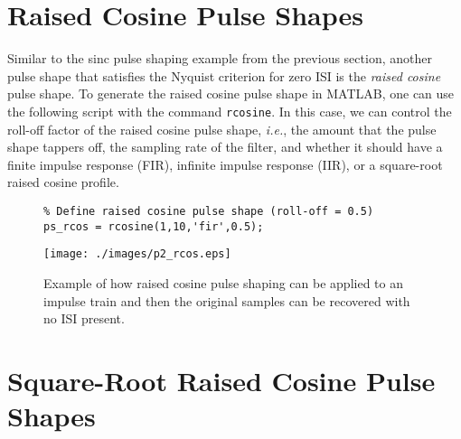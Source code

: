 \documentclass[letterpaper,12pt]{article}
\begin{document}
\section{Raised Cosine Pulse Shapes}

Similar to the sinc pulse shaping example from the previous section, another pulse shape that satisfies the Nyquist criterion for zero ISI is the \textit{raised cosine} pulse shape.  To generate the raised cosine
pulse shape in MATLAB, one can use the following script with the command \texttt{rcosine}.  In this case, we can control the roll-off factor of the raised cosine pulse shape, \textit{i.e.}, the amount that the pulse shape tappers off,
the sampling rate of the filter, and whether it should have a finite impulse response (FIR), infinite impulse response (IIR), or a square-root raised cosine profile.
\begin{figure}[h]
\centering
\begin{minipage}[framed]{0.9\textwidth}
\begin{lstlisting}
% Define raised cosine pulse shape (roll-off = 0.5)
ps_rcos = rcosine(1,10,'fir',0.5);
\end{lstlisting}
\end{minipage}
\captionsetup{labelformat=empty}
\end{figure}



\begin{figure}[h]
 \centering
 \texttt{[image: ./images/p2\_rcos.eps]}
 \caption{Example of how raised cosine pulse shaping can be applied to an impulse train and then the original samples can be recovered with no ISI present.}\label{f:p2_rcos}
\end{figure}

\section{Square-Root Raised Cosine Pulse Shapes}
\end{document}
